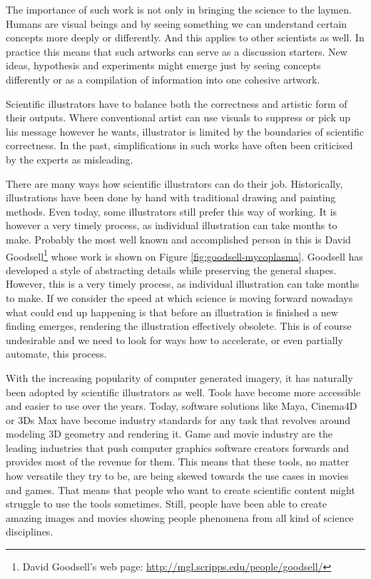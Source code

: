 \documentclass[
  digital, %
  table,   %
  nolof,     %
  nolot,     %
]{fithesis3}
\begin{document}
The importance of such work is not only in bringing the science to the laymen. Humans are visual beings and by seeing something we can understand certain concepts more deeply or differently. And this applies to other scientists as well. In practice this means that such artworks can serve as a discussion starters. New ideas, hypothesis and experiments might emerge just by seeing concepts differently or as a compilation of information into one cohesive artwork.

Scientific illustrators have to balance both the correctness and artistic form of their outputs. Where conventional artist can use visuals to suppress or pick up his message however he wants, illustrator is limited by the boundaries of scientific correctness. In the past, simplifications in such works have often been criticised by the experts as misleading.

There are many ways how scientific illustrators can do their job. Historically, illustrations have been done by hand with traditional drawing and painting methods. Even today, some illustrators still prefer this way of working. It is however a very timely process, as individual illustration can take months to make. Probably the most well known and accomplished person in this is David Goodsell\footnote{
  David Goodsell's web page: \url{http://mgl.scripps.edu/people/goodsell/}
} whose work is shown on Figure \ref{fig:goodsell-mycoplasma}. Goodsell has developed a style of abstracting details while preserving the general shapes. However, this is a very timely process, as individual illustration can take months to make\cite{DavidGoodsellVideo}. If we consider the speed at which science is moving forward nowadays what could end up happening is that before an illustration is finished a new finding emerges, rendering the illustration effectively obsolete. This is of course undesirable and we need to look for ways how to accelerate, or even partially automate, this process.

With the increasing popularity of computer generated imagery, it has naturally been adopted by scientific illustrators as well. Tools have become more accessible and easier to use over the years. Today, software solutions like Maya, Cinema4D or 3Ds Max have become industry standards for any task that revolves around modeling 3D geometry and rendering it. Game and movie industry are the leading industries that push computer graphics software creators forwards and provides most of the revenue for them. This means that these tools, no matter how versatile they try to be, are being skewed towards the use cases in movies and games. That means that people who want to create scientific content might struggle to use the tools sometimes. Still, people have been able to create amazing images and movies showing people phenomena from all kind of science disciplines.
\end{document}
